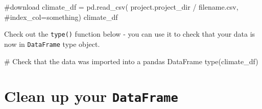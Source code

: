 \documentclass[
  letterpaper,
  DIV=11,
  numbers=noendperiod,
  oneside]{scrreprt}
\newenvironment{Shaded}{\begin{snugshade}}{\end{snugshade}}
\newcommand{\BuiltInTok}[1]{\textcolor[rgb]{0.00,0.23,0.31}{#1}}
\newcommand{\CommentTok}[1]{\textcolor[rgb]{0.37,0.37,0.37}{#1}}
\newcommand{\NormalTok}[1]{\textcolor[rgb]{0.00,0.23,0.31}{#1}}
\newcommand{\OperatorTok}[1]{\textcolor[rgb]{0.37,0.37,0.37}{#1}}
\newcommand{\StringTok}[1]{\textcolor[rgb]{0.13,0.47,0.30}{#1}}
\begin{document}
\begin{Shaded}
\begin{Highlighting}[]
\CommentTok{\#download}
\NormalTok{climate\_df }\OperatorTok{=}\NormalTok{ pd.read\_csv(}
\NormalTok{    project.project\_dir }\OperatorTok{/} \StringTok{\textquotesingle{}filename.csv\textquotesingle{}}\NormalTok{,}
    \CommentTok{\#index\_col=\textquotesingle{}something\textquotesingle{})}
\NormalTok{climate\_df}
\end{Highlighting}
\end{Shaded}

\begin{tcolorbox}[enhanced jigsaw, colbacktitle=quarto-callout-tip-color!10!white, opacityback=0, bottomtitle=1mm, toptitle=1mm, bottomrule=.15mm, left=2mm, colframe=quarto-callout-tip-color-frame, leftrule=.75mm, opacitybacktitle=0.6, colback=white, rightrule=.15mm, toprule=.15mm, breakable, titlerule=0mm, title=\textcolor{quarto-callout-tip-color}{\faLightbulb}\hspace{0.5em}{Tip}, coltitle=black, arc=.35mm]

Check out the \texttt{type()} function below - you can use it to check
that your data is now in \texttt{DataFrame} type object.

\end{tcolorbox}

\begin{Shaded}
\begin{Highlighting}[]
\CommentTok{\# Check that the data was imported into a pandas DataFrame}
\BuiltInTok{type}\NormalTok{(climate\_df)}
\end{Highlighting}
\end{Shaded}

\section{\texorpdfstring{Clean up your
\texttt{DataFrame}}{Clean up your DataFrame}}\label{clean-up-your-dataframe}
\end{document}
